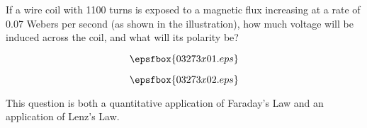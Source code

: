 

If a wire coil with 1100 turns is exposed to a magnetic flux increasing at a rate of 0.07 Webers per second (as shown in the illustration), how much voltage will be induced across the coil, and what will its polarity be?

$$\epsfbox{03273x01.eps}$$







$$\epsfbox{03273x02.eps}$$







This question is both a quantitative application of Faraday's Law and an application of Lenz's Law.




